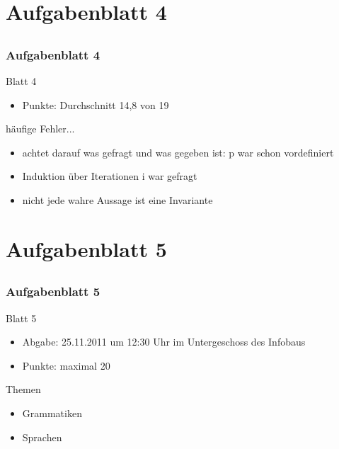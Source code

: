 \section[Blatt 4]{Aufgabenblatt 4}
\subsection*{}
\begin{frame}
	\frametitle{Aufgabenblatt 4}
	\begin{block}{Blatt 4}
		\begin{itemize}
			\item Punkte: Durchschnitt 14,8 von 19
		\end{itemize}
  \end{block}
  
	\begin{block}{häufige Fehler...}
		\begin{itemize}
			\item[4.2b:] achtet darauf was gefragt und was gegeben ist: p war schon vordefiniert \pause
			\item[4.3c:] Induktion über Iterationen i war gefragt \pause
			\item[4.3b:] nicht jede wahre Aussage ist eine Invariante
		 \end{itemize}
	\end{block}
\end{frame}

\section[Blatt 5]{Aufgabenblatt 5}
\subsection*{}
\begin{frame}
	\frametitle{Aufgabenblatt 5}
	\begin{block}{Blatt 5}
		\begin{itemize}
			\item Abgabe: 25.11.2011 um 12:30 Uhr im Untergeschoss des Infobaus
			\item Punkte: maximal 20
		\end{itemize}
  \end{block}
	\begin{block}{Themen}
		\begin{itemize}
	  		\item Grammatiken
	  		\item Sprachen
	  \end{itemize}
	\end{block}
\end{frame}

